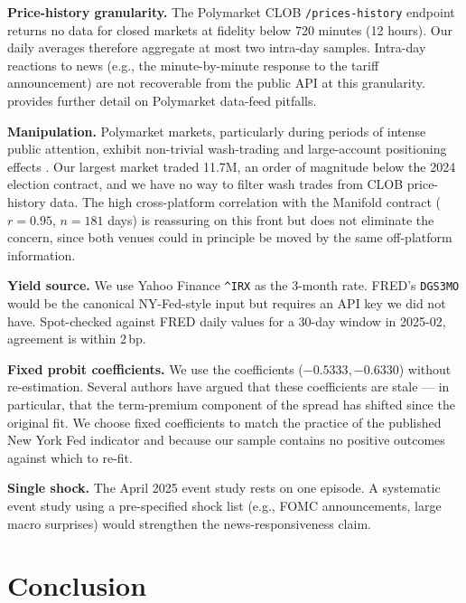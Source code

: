 \documentclass{article}
\begin{document}
\textbf{Price-history granularity.} The Polymarket CLOB \texttt{/prices-history} endpoint returns no data for closed markets at fidelity below 720 minutes (12 hours). Our daily averages therefore aggregate at most two intra-day samples. Intra-day reactions to news (e.g., the minute-by-minute response to the tariff announcement) are not recoverable from the public API at this granularity. \citet{dubach2026anatomy} provides further detail on Polymarket data-feed pitfalls.

\textbf{Manipulation.} Polymarket markets, particularly during periods of intense public attention, exhibit non-trivial wash-trading and large-account positioning effects \citep{tsang2026anatomy,dubach2026anatomy}. Our largest market traded \textdollar 11.7M, an order of magnitude below the 2024 election contract, and we have no way to filter wash trades from CLOB price-history data. The high cross-platform correlation with the Manifold contract ($r=0.95$, $n=181$ days) is reassuring on this front but does not eliminate the concern, since both venues could in principle be moved by the same off-platform information.

\textbf{Yield source.} We use Yahoo Finance \texttt{\^{}IRX} as the 3-month rate. FRED's \texttt{DGS3MO} would be the canonical NY-Fed-style input but requires an API key we did not have. Spot-checked against FRED daily values for a 30-day window in 2025-02, agreement is within \num{2}\,bp.

\textbf{Fixed probit coefficients.} We use the \citet{estrella1998predicting} coefficients ($-0.5333, -0.6330$) without re-estimation. Several authors \citep{engstrom2019near,bauer2018information,liu2016what} have argued that these coefficients are stale --- in particular, that the term-premium component of the spread has shifted since the original fit. We choose fixed coefficients to match the practice of the published New York Fed indicator and because our sample contains no positive outcomes against which to re-fit.

\textbf{Single shock.} The April 2025 event study rests on one episode. A systematic event study using a pre-specified shock list (e.g., FOMC announcements, large macro surprises) would strengthen the news-responsiveness claim.

\section{Conclusion}
\end{document}
